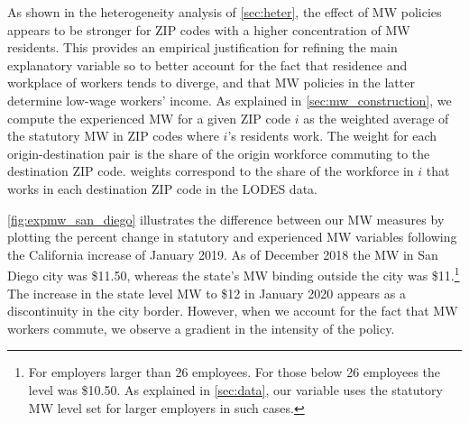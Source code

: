 As shown in the heterogeneity analysis of \autoref{sec:heter}, the effect of MW policies 
appears to be stronger for ZIP codes with a higher concentration of MW residents. This 
provides an empirical justification for refining the main explanatory variable so to 
better account for the fact that residence and workplace of workers tends to diverge, 
and that MW policies in the latter determine low-wage workers' income. As explained in 
\autoref{sec:mw_construction}, we compute the experienced MW for a given ZIP code $i$ as 
the weighted average of the statutory MW in ZIP codes where $i$'s residents  work.
The weight for each origin-destination pair is the share of the origin workforce commuting to
the destination ZIP code. weights correspond to the share of the workforce in $i$ that works in 
each destination ZIP code in the LODES data.

\autoref{fig:expmw_san_diego} illustrates the difference between our MW measures by plotting 
the percent change in statutory and experienced MW variables following the California 
increase of January 2019. As of December 2018 the MW in San Diego city was \$11.50, 
whereas the state's MW binding outside the city was \$11.\footnote{For employers larger 
	than 26 employees. For those below 26 employees the level was \$10.50. As explained in 
	\autoref{sec:data}, our variable uses the statutory MW level set for 
	larger employers in such cases.}
The increase in the state level MW to \$12 in January 2020 appears as a discontinuity in the 
city border. However, when we account for the fact that MW workers commute, we observe a 
gradient in the intensity of the policy.

